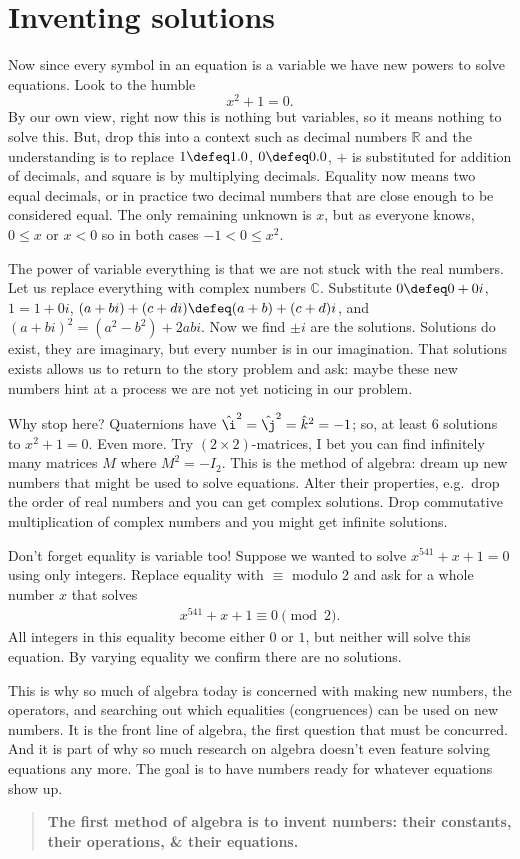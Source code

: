 \section{Inventing solutions}
Now since every symbol in an equation is a variable we have new powers 
to solve equations.  Look to the humble 
\[
    x^2+1=0.
\]
By our own view, right now this is nothing but variables, so it means nothing to
solve this.  But, drop this into a context such as decimal numbers $\mathbb{R}$
and the understanding is to replace $1\defeq 1.0$, $0\defeq 0.0$, $+$ is
substituted for addition of decimals, and square is by multiplying decimals.
Equality now means two equal decimals, or in practice two decimal numbers that
are close enough to be considered equal.  The only remaining unknown is $x$, but
as everyone knows, $0\leq x$ or $x<0$ so in both cases $-1<0\leq x^2$.

The power of variable everything is that we are not stuck with the real numbers.
Let us replace everything with complex numbers $\mathbb{C}$. Substitute $0\defeq
0+0i$, $1=1+0i$, $(a+bi)+(c+di)\defeq (a+b)+(c+d)i$, and
$(a+bi)^2=(a^2-b^2)+2abi$.  Now we find $\pm i$ are the solutions. Solutions do
exist, they are imaginary, but every number is in our imagination. 
That solutions exists allows us to return to the story problem and ask:
maybe these new numbers hint at a process we are not yet noticing in our 
problem.

Why stop here? Quaternions have $\hat{\i}^2=\hat{\j}^2=\hat{k}^2=-1$;
so, at least 6 solutions to $x^2+1=0$.  Even more.  Try $(2\times 2)$-matrices, I
bet you can find infinitely many matrices $M$ where $M^2=-I_2$.  This is the method
of algebra: dream up new numbers that might be used to solve equations.  Alter
their properties, e.g.\ drop the order of real numbers and you can get complex
solutions.  Drop commutative multiplication of complex numbers and you might get
infinite solutions.  

Don't forget equality is variable too!  Suppose we wanted to solve $x^{541}+x+1=0$
using only integers.  Replace equality 
with $\equiv$ modulo 2 and ask for a whole number $x$ that solves
\begin{align*}
    x^{541}+x+1\equiv 0\pmod{2}.
\end{align*}
All integers in this equality become either $0$ or $1$, but neither will solve 
this equation.  By varying equality we confirm there are no solutions.

This is why so much of algebra today is concerned with making new numbers, the
operators, and searching out which equalities (congruences) can be used on new
numbers.  It is the front line of algebra, the first question that must be
concurred.  And it is  part of why so much research on algebra doesn't even
feature solving equations any more.  The goal is to have numbers ready for
whatever equations show up.

\begin{quote}
    \textbf{The first method of algebra is to invent numbers: their constants,
    their operations, \& their equations.}%
\end{quote}
